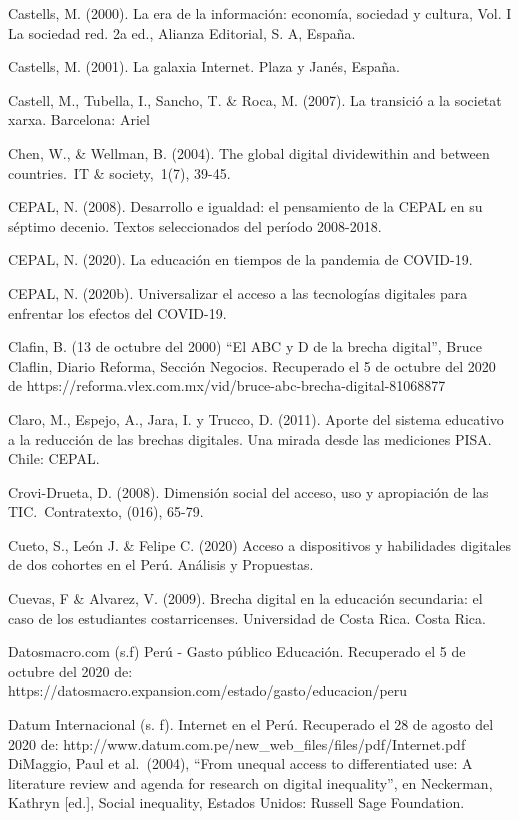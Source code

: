 Castells, M. (2000). La era de la información: economía, sociedad y
cultura, Vol. I La sociedad red. 2a ed., Alianza Editorial, S. A,
España.

Castells, M. (2001). La galaxia Internet. Plaza y Janés, España.

Castell, M., Tubella, I., Sancho, T. \& Roca, M. (2007). La transició a
la societat xarxa. Barcelona: Ariel

Chen, W., \& Wellman, B. (2004). The global digital dividewithin and
between countries.~IT \& society,~1(7), 39-45.

CEPAL, N. (2008). Desarrollo e igualdad: el pensamiento de la CEPAL en
su séptimo decenio. Textos seleccionados del período 2008-2018.

CEPAL, N. (2020). La educación en tiempos de la pandemia de COVID-19.

CEPAL, N. (2020b). Universalizar el acceso a las tecnologías digitales
para enfrentar los efectos del COVID-19.

Clafin, B. (13 de octubre del 2000) ``El ABC y D de la brecha digital'',
Bruce Claflin, Diario Reforma, Sección Negocios. Recuperado el 5 de
octubre del 2020 de
https://reforma.vlex.com.mx/vid/bruce-abc-brecha-digital-81068877

Claro, M., Espejo, A., Jara, I. y Trucco, D. (2011). Aporte del sistema
educativo a la reducción de las brechas digitales. Una mirada desde las
mediciones PISA. Chile: CEPAL.

Crovi-Drueta, D. (2008). Dimensión social del acceso, uso y apropiación
de las TIC.~Contratexto, (016), 65-79.

Cueto, S., León J. \& Felipe C. (2020) Acceso a dispositivos y
habilidades digitales de dos cohortes en el Perú. Análisis y Propuestas.

Cuevas, F \& Alvarez, V. (2009). Brecha digital en la educación
secundaria: el caso de los estudiantes costarricenses. Universidad de
Costa Rica. Costa Rica.

Datosmacro.com (s.f) Perú - Gasto público Educación. Recuperado el 5 de
octubre del 2020 de:
https://datosmacro.expansion.com/estado/gasto/educacion/peru

Datum Internacional (s. f). Internet en el Perú. Recuperado el 28 de
agosto del 2020 de:
http://www.datum.com.pe/new\_web\_files/files/pdf/Internet.pdf DiMaggio,
Paul et al.~(2004), ``From unequal access to differentiated use: A
literature review and agenda for research on digital inequality'', en
Neckerman, Kathryn {[}ed.{]}, Social inequality, Estados Unidos: Russell
Sage Foundation.


